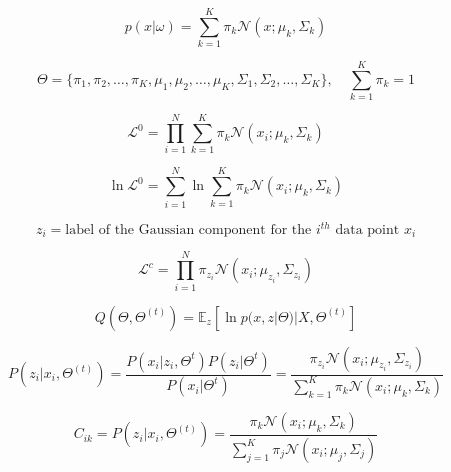 \documentclass[10pt]{article}
\begin{document}
\begin{multicols}{2}
\begin{equation*}
    p(x | \omega) = \sum_{k=1}^{K} \pi_{k} \mathcal{N}(x ; \mu_{k}, \Sigma_{k})
\end{equation*}

\begin{equation*}
    \Theta = \{ \pi_{1}, \pi_{2}, \ldots, \pi_{K}, \mu_{1}, \mu_{2}, \ldots, \mu_{K}, \Sigma_{1}, \Sigma_{2}, \ldots, \Sigma_{K} \}, \quad \sum_{k=1}^{K} \pi_{k} = 1
\end{equation*}


\begin{equation*} \label{eq:observed-likelihood}
    \mathcal{L}^0 = \prod_{i=1}^{N} \sum_{k=1}^{K} \pi_{k} \mathcal{N}(x_i ; \mu_{k}, \Sigma_{k})
\end{equation*}

\begin{equation*} \label{eq:log-likelihood}
    \ln \mathcal{L}^0 = \sum_{i=1}^{N} \ln \sum_{k=1}^{K} \pi_{k} \mathcal{N}(x_i ; \mu_{k}, \Sigma_{k})
\end{equation*}

\begin{equation*} \label{eq:hidden-latent}
    z_{i} = \text{label of the Gaussian component for the $i^{th}$ data point $x_i$}
\end{equation*}
    
\begin{equation*}
    \mathcal{L}^c = \prod_{i=1}^{N} \pi_{z_{i}} \mathcal{N}(x_i ; \mu_{z_{i}}, \Sigma_{z_{i}})
\end{equation*}

\begin{equation*}
    Q(\Theta, \Theta^{(t)}) = \mathbb{E}_{z}[\ln p(x, z | \Theta) | X, \Theta^{(t)}]
\end{equation*}

\begin{equation*}
    P(z_{i} | x_{i}, \Theta^{(t)}) = \frac{P(x_i | z_i, \Theta^t) P(z_i | \Theta^t)}{P(x_i | \Theta^t)} = \frac{\pi_{z_{i}} \mathcal{N}(x_i ; \mu_{z_{i}}, \Sigma_{z_{i}})}{\sum_{k=1}^{K} \pi_{k} \mathcal{N}(x_i ; \mu_{k}, \Sigma_{k})} 
\end{equation*}

\begin{equation*}
    C_{ik} = P(z_i | x_i, \Theta^{(t)}) = \frac{\pi_{k} \mathcal{N}(x_i ; \mu_{k}, \Sigma_{k})}{\sum_{j=1}^{K} \pi_{j} \mathcal{N}(x_i ; \mu_{j}, \Sigma_{j})}
\end{equation*}


\end{multicols}
\end{document}
